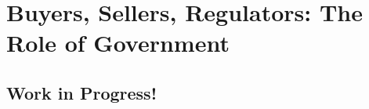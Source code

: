 %

\chapter{Buyers, Sellers, Regulators: The Role of Government}
\label{gvmt}

\section{Work in Progress!}

\begin{comment}
\section{First and Second Welfare Theorems}
\subsection{Pareto and Kaldor-Hicks}

\section{The Case Against Government Intervention}
\subsection{Price Ceilings and Price Floors}
\subsection{Taxes and Subsidies}

\section{The Case For Government Intervention}
\subsection{Integrity of the Market: Antitrust Economics}
\subsection{Information Problems}
\subsection{Incentive Problems}
\subsubsection{Negative Externalities}
\subsubsection{Positive Externalities}
\subsection{Individual Failure}
\end{comment} 
